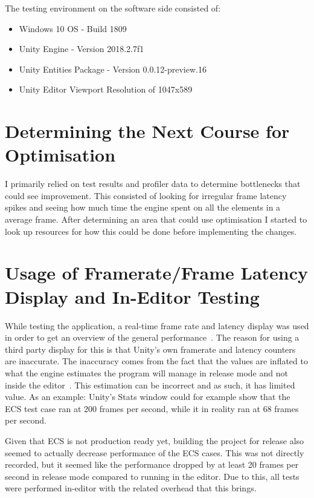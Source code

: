 The testing environment on the software side consisted of:
\begin{itemize}
    \item Windows 10 OS - Build 1809
    \item Unity Engine - Version 2018.2.7f1
    \item Unity Entities Package - Version 0.0.12-preview.16
    \item Unity Editor Viewport Resolution of 1047x589
\end{itemize}

\section{Determining the Next Course for Optimisation}
I primarily relied on test results and profiler data to determine bottlenecks that could see improvement. This consisted of looking for irregular frame latency spikes and seeing how much time the engine spent on all the elements in a average frame. After determining an area that could use optimisation I started to look up resources for how this could be done before implementing the changes. 

\section{Usage of Framerate/Frame Latency Display and In-Editor Testing}
While testing the application, a real-time frame rate and latency display was used in order to get an overview of the general performance~\cite{graphy}. The reason for using a third party display for this is that Unity's own framerate and latency counters are inaccurate. The inaccuracy comes from the fact that the values are inflated to what the engine estimates the program will manage in release mode and not inside the editor~\cite{forumFramerateStats}. This estimation can be incorrect and as such, it has limited value. As an example: Unity's Stats window could for example show that the ECS test case ran at 200 frames per second, while it in reality ran at 68 frames per second. 

Given that ECS is not production ready yet, building the project for release also seemed to actually decrease performance of the ECS cases. This was not directly recorded, but it seemed like the performance dropped by at least 20 frames per second in release mode compared to running in the editor. Due to this, all tests were performed in-editor with the related overhead that this brings. 